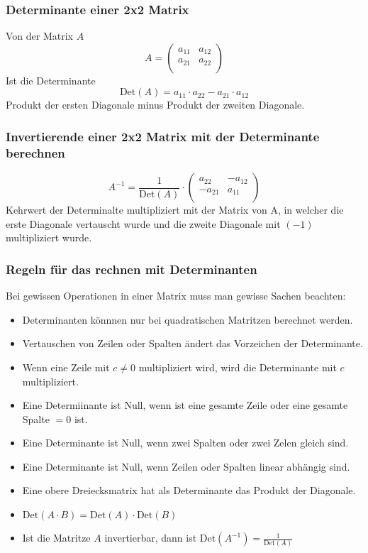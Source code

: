 \subsubsection{Determinante einer 2x2 Matrix}
Von der Matrix $A$
\[ A =
  \begin {pmatrix}
    a_{11} & a_{12} \\
    a_{21} & a_{22} \\
  \end {pmatrix} \]
Ist die Determinante
\[ \text{Det}(A) = 
    a_{11} \cdot a_{22} - a_{21} \cdot a_{12} \]
Produkt der ersten Diagonale minus Produkt der zweiten Diagonale.

\subsubsection{Invertierende einer 2x2 Matrix mit der Determinante berechnen}
\[ A^{-1} = \frac{1}{\text{Det}(A)} \cdot 
  \begin {pmatrix}
    a_{22} & -a_{12} \\
    -a_{21} & a_{11} \\
  \end {pmatrix} \]
Kehrwert der Determinalte multipliziert mit der Matrix von A, in welcher
die erste Diagonale vertauscht wurde und die zweite Diagonale mit $(-1)$
multipliziert wurde.

\subsubsection{Regeln für das rechnen mit Determinanten}
Bei gewissen Operationen in einer Matrix muss man gewisse Sachen
beachten:
\begin{itemize}
  \item Determinanten könnnen nur bei quadratischen Matritzen berechnet
    werden.
  \item Vertauschen von Zeilen oder Spalten ändert das Vorzeichen der
    Determinante.
  \item Wenn eine Zeile mit $c \ne 0$ multipliziert wird, wird die
    Determinante mit $c$ multipliziert.
  \item Eine Determiinante ist Null, wenn ist eine gesamte Zeile oder
    eine gesamte Spalte $= 0$ ist.
  \item Eine Determinante ist Null, wenn zwei Spalten oder zwei Zelen
    gleich sind.
  \item Eine Determinante ist Null, wenn Zeilen oder Spalten linear
    abhängig sind.
  \item Eine obere Dreiecksmatrix hat als Determinante das Produkt der
    Diagonale.
  \item $\text{Det}(A \cdot B) = \text{Det}(A) \cdot \text{Det}(B)$
  \item Ist die Matritze $A$ invertierbar, dann ist $\text{Det}(A^{-1}) =
    \frac{1}{\text{Det}(A)}$
\end{itemize}


